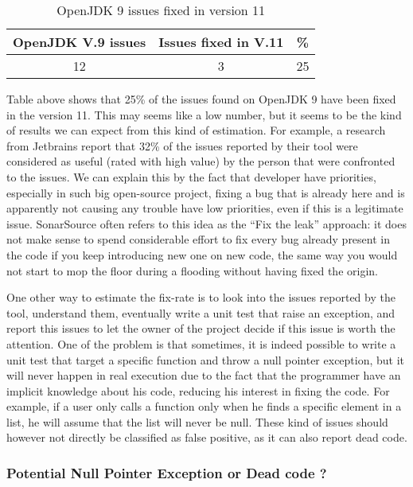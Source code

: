 \begin{table}[h]
	\centering
	\caption{OpenJDK 9 issues fixed in version 11}
	\label{table:openJDK_issues}
	\begin{tabular}{|c|c|c|}
		\hline
		\bf OpenJDK V.9  issues & \bf Issues fixed in V.11 & \bf \% \\ \hline
		12 &  3 &  25 \\ \hline
	\end{tabular}
\end{table}

Table above shows that 25\% of the issues found on OpenJDK 9 have been fixed in the version 11. This may seems like a low number, but it seems to be the kind of results we can expect from this kind of estimation. For example, a research from Jetbrains \cite{Bryksin:2018:DAK:3236454.3236457} report that 32\% of the issues reported by their tool were considered as useful (rated with high value) by the person that were confronted to the issues. 
We can explain this by the fact that developer have priorities, especially in such big open-source project, fixing a bug that is already here and is apparently not causing any trouble have low priorities, even if this is a legitimate issue. 
SonarSource often refers to this idea as the “Fix the leak” approach: it does not make sense to spend considerable effort to fix every bug already present in the code if you keep introducing new one on new code, the same way you would not start to mop the floor during a flooding without having fixed the origin. \newline

One other way to estimate the fix-rate is to look into the issues reported by the tool, understand them, eventually write a unit test that raise an exception, and report this issues to let the owner of the project decide if this issue is worth the attention.
One of the problem is that sometimes, it is indeed possible to write a unit test that target a specific function and throw a null pointer exception, but it will never happen in real execution due to the fact that the programmer have an implicit knowledge about his code, reducing his interest in fixing the code. 
For example, if a user only calls a function only when he finds a specific element in a list, he will assume that the list will never be null. 
These kind of issues should however not directly be classified as false positive, as it can also report dead code.

\subsubsection{Potential Null Pointer Exception or Dead code ?}
\label{subsubsec:dead_code}

